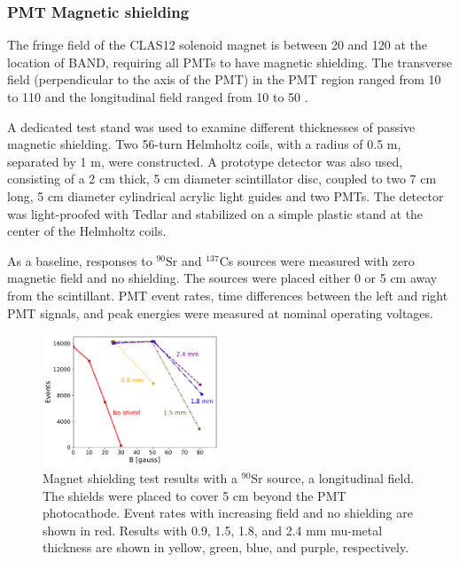 \documentclass[3p,twocolumn]{elsarticle}
\begin{document}
\subsubsection{PMT Magnetic shielding}


The fringe field of the CLAS12 solenoid magnet
\cite{Fair:2020yfx} is between 20 and 120 \si{\gauss} at the location of
BAND, requiring all PMTs to have magnetic shielding. The transverse
field (perpendicular to the axis of the PMT) in the PMT region ranged from 10 to
  110 \si{\gauss} and the longitudinal field ranged from 10 to 50 \si{\gauss}.

  A dedicated test stand was used to examine different thicknesses of
  passive magnetic shielding. Two 56-turn Helmholtz
  coils, with a radius of 0.5 \si{\meter}, separated by 1 \si{\meter}, were 
  constructed. A prototype detector was also used, consisting of a 2 \si{\centi\meter} thick, 5
  \si{\centi\meter} diameter scintillator disc, coupled to two
  7 \si{\centi\meter} long, 5 \si{\centi\meter} diameter cylindrical
  acrylic light guides and two PMTs. The detector was
  light-proofed with Tedlar\textregistered{} and stabilized on a simple plastic stand
  at the center of the Helmholtz coils.

  As a baseline, responses to $^{90}$Sr and $^{137}$Cs sources were measured with zero magnetic field and no shielding. The sources were placed either 0 or 5 \si{\centi\meter} away from the scintillant. PMT event rates, time differences between the left and right PMT signals, and peak energies were measured at nominal operating voltages.
\begin{figure}[tb]
	\centering
			\includegraphics[width=0.47\textwidth]{fig9-shields.pdf}
	\caption{Magnet shielding test results with a $^{90}$Sr source, a longitudinal field. The shields were placed to cover 5 \si{\centi\meter} beyond the PMT photocathode. Event rates with increasing field and no shielding are shown in red. Results with 0.9, 1.5, 1.8, and 2.4 \si{\milli\meter} mu-metal thickness are shown in yellow, green, blue, and purple, respectively.}
	\label{fig:shielding_results}
\end{figure}  
  
\end{document}
